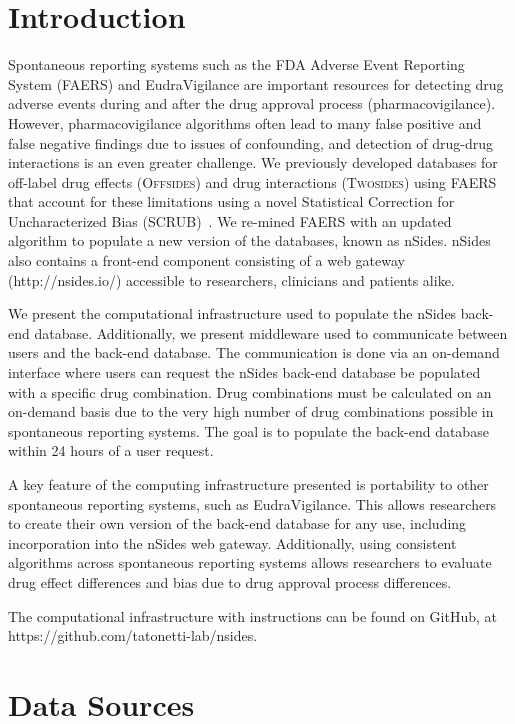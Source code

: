 \documentclass{ws-procs11x85}
\begin{document}
\bodymatter

\section{Introduction}

Spontaneous reporting systems such as the FDA Adverse Event Reporting
System (FAERS) and EudraVigilance are important resources for
detecting drug adverse events during and after the drug approval
process (pharmacovigilance). However, pharmacovigilance algorithms
often lead to many false positive and false negative findings due to
issues of confounding, and detection of drug-drug interactions is an
even greater challenge.  We previously developed databases for
off-label drug effects (O\textsc{ffsides}) and drug interactions
(T\textsc{wosides}) using FAERS that account for these limitations
using a novel Statistical Correction for Uncharacterized Bias
(SCRUB)~\cite{Tatonetti2012}.  We re-mined FAERS with an updated
algorithm to populate a new version of the databases, known as nSides.
nSides also contains a front-end component consisting of a web gateway
(http://nsides.io/) accessible to researchers, clinicians and patients
alike.

We present the computational infrastructure used to populate the
nSides back-end database. Additionally, we present middleware used to
communicate between users and the back-end database.  The
communication is done via an on-demand interface where users can
request the nSides back-end database be populated with a specific drug
combination. Drug combinations must be calculated on an on-demand
basis due to the very high number of drug combinations possible in
spontaneous reporting systems. The goal is to populate the back-end
database within 24 hours of a user request.

A key feature of the computing infrastructure presented is portability
to other spontaneous reporting systems, such as EudraVigilance.  This
allows researchers to create their own version of the back-end
database for any use, including incorporation into the nSides web
gateway. Additionally, using consistent algorithms across
spontaneous reporting systems allows researchers to evaluate drug
effect differences and bias due to drug approval process differences.

The computational infrastructure with instructions can be found on GitHub, at https://github.com/tatonetti-lab/nsides.


\section{Data Sources}
\end{document}
